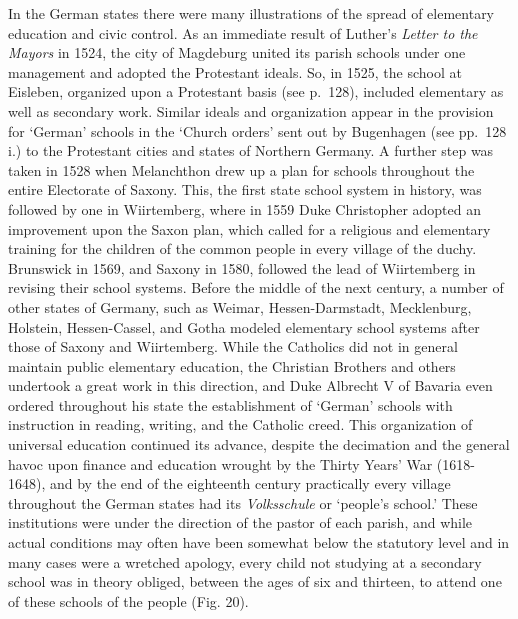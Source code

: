 \documentclass[]{book}
\begin{document}
In the German states there were many illustrations of the spread of elementary education and civic control. As an immediate result of Luther's \emph{Letter to the Mayors} in 1524, the city of Magdeburg united its parish schools under one management and adopted the Protestant ideals. So, in 1525, the school at Eisleben, organized upon a Protestant basis (see p.~128), included elementary as well as secondary work. Similar ideals and organization appear in the provision for `German' schools in the `Church orders' sent out by Bugenhagen (see pp.~128 i.) to the Protestant cities and states of Northern Germany. A further step was taken in 1528 when Melanchthon drew up a plan for schools throughout the entire Electorate of Saxony. This, the first state school system in history, was followed by one in Wiirtemberg, where in 1559 Duke Christopher adopted an improvement upon the Saxon plan, which called for a religious and elementary training for the children of the common people in every village of the duchy. Brunswick in 1569, and Saxony in 1580, followed the lead of Wiirtemberg in revising their school systems. Before the middle of the next century, a number of other states of Germany, such as Weimar, Hessen-Darmstadt, Mecklenburg, Holstein, Hessen-Cassel, and Gotha modeled elementary school systems after those of Saxony and Wiirtemberg. While the Catholics did not in general maintain public elementary education, the Christian Brothers and others undertook a great work in this direction, and Duke Albrecht V of Bavaria even ordered throughout his state the establishment of `German' schools with instruction in reading, writing, and the Catholic creed. This organization of universal education continued its advance, despite the decimation and the general havoc upon finance and education wrought by the Thirty Years' War (1618-1648), and by the end of the eighteenth century practically every village throughout the German states had its \emph{Volksschule} or `people's school.' These institutions were under the direction of the pastor of each parish, and while actual conditions may often have been somewhat below the statutory level and in many cases were a wretched apology, every child not studying at a secondary school was in theory obliged, between the ages of six and thirteen, to attend one of these schools of the people (Fig. 20).
\end{document}
